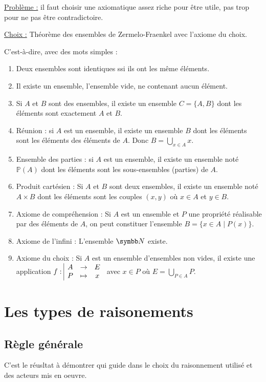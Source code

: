 \uline{Problème :} il faut choisir une axiomatique assez riche pour être utile, 
pas trop pour ne pas être contradictoire. 

\uline{Choix :} Théorème des ensembles de Zermelo-Fraenkel avec l'axiome du choix.

C'est-à-dire, avec des mots simples : 

\begin{enumerate}
    \item Deux ensembles sont identiques ssi ils ont les même éléments. 
    \item Il existe un ensemble, l'ensemble vide, ne contenant aucun élément.
    \item Si $A$ et $B$ sont des ensembles, il existe un ensemble $C = \{A, B\}$
            dont les éléments sont exactement $A$ et $B$.
    \item Réunion : si $A$ est un ensemble, il existe un ensemble $B$ dont les éléments
        sont les éléments des éléments de $A$. Donc $B = \bigcup_{x \in A} x$.
    \item Ensemble des parties : si $A$ est un ensemble, il existe un ensemble noté
        $\mathbb P(A)$ dont les éléments sont les sous-ensembles (parties) de $A$.
    \item Produit cartésien : Si $A$ et $B$ sont deux ensembles, il existe un ensemble
        noté $A \times B$ dont les éléments sont les couples $(x, y)$ où $x \in A$ 
        et $y \in B$.
    \item Axiome de compréhension : Si $A$ est un ensemble et $P$ une propriété réalisable
        par des éléments de $A$, on peut constituer l'ensemble $B = \{x \in A \mid P(x)\}$.
    \item Axiome de l'infini : L'ensemble $\N$ existe.
    \item Axiome du choix : Si $A$ est un ensemble d'ensembles non vides, il existe une 
        application $f: \space \begin{array}{|ccc} \displaystyle A & \to & \displaystyle E \\ \displaystyle P & \mapsto & \displaystyle x \end{array}$ avec $x \in P$ où $E = \bigcup_{P \in A} P$.
\end{enumerate}

\section{Les types de raisonements}

\subsection{Règle générale}

C'est le réusltat à démontrer qui guide dans le choix du raisonnement utilisé et des
acteurs mis en oeuvre. 

